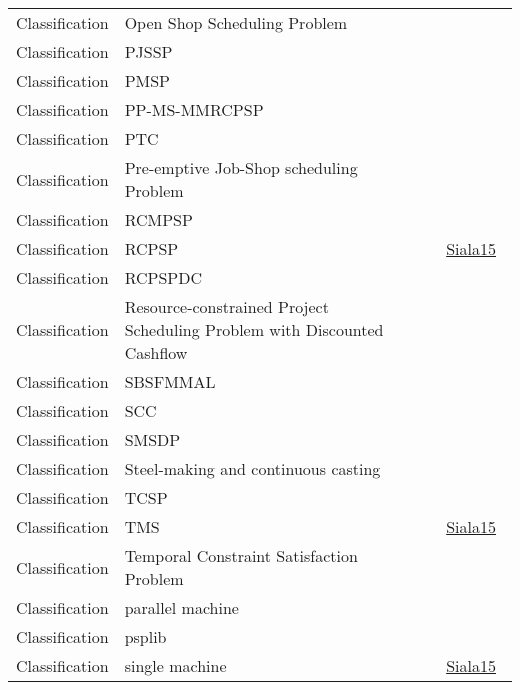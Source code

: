 {\begin{longtable}{lp{3cm}>{\raggedright\arraybackslash}p{6cm}>{\raggedright\arraybackslash}p{6cm}>{\raggedright\arraybackslash}p{8cm}}
Classification & Open Shop Scheduling Problem &  &  & \\
Classification & PJSSP &  &  & \\
Classification & PMSP &  &  & \\
Classification & PP-MS-MMRCPSP &  &  & \\
Classification & PTC &  &  & \\
Classification & Pre-emptive Job-Shop scheduling Problem &  &  & \\
Classification & RCMPSP &  &  & \\
Classification & RCPSP &  &  & \href{cars/works/Siala15.pdf}{Siala15}~\cite{Siala15}\\
Classification & RCPSPDC &  &  & \\
Classification & Resource-constrained Project Scheduling Problem with Discounted Cashflow &  &  & \\
Classification & SBSFMMAL &  &  & \\
Classification & SCC &  &  & \\
Classification & SMSDP &  &  & \\
Classification & Steel-making and continuous casting &  &  & \\
Classification & TCSP &  &  & \\
Classification & TMS &  &  & \href{cars/works/Siala15.pdf}{Siala15}~\cite{Siala15}\\
Classification & Temporal Constraint Satisfaction Problem &  &  & \\
Classification & parallel machine &  &  & \\
Classification & psplib &  &  & \\
Classification & single machine &  &  & \href{cars/works/Siala15.pdf}{Siala15}~\cite{Siala15}\\
\end{longtable}
}

